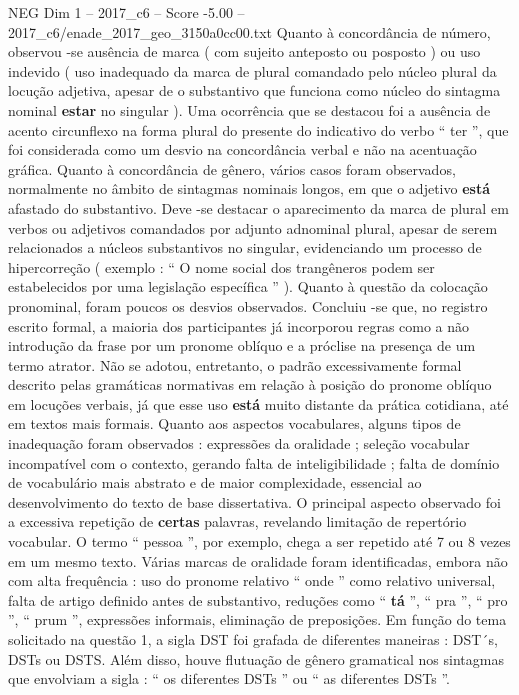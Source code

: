\begin{textsample}{NEG Dim 1 – 2017\_c6 – Score -5.00 – 2017\_c6/enade\_2017\_geo\_3150a0cc00.txt}
Quanto à concordância de número, observou -se ausência de marca ( com sujeito anteposto ou posposto ) ou uso indevido ( uso inadequado da marca de plural comandado pelo núcleo plural da locução adjetiva, apesar de o substantivo que funciona como núcleo do sintagma nominal \textbf{estar} no singular ).
Uma ocorrência que se destacou foi a ausência de acento circunflexo na forma plural do presente do indicativo do verbo “ ter ”, que foi considerada como um desvio na concordância verbal e não na acentuação gráfica.
Quanto à concordância de gênero, vários casos foram observados, normalmente no âmbito de sintagmas nominais longos, em que o adjetivo \textbf{está} afastado do substantivo.
Deve -se destacar o aparecimento da marca de plural em verbos ou adjetivos comandados por adjunto adnominal plural, apesar de serem relacionados a núcleos substantivos no singular, evidenciando um processo de hipercorreção ( exemplo : “ O nome social dos trangêneros podem ser estabelecidos por uma legislação específica ” ).
Quanto à questão da colocação pronominal, foram poucos os desvios observados.
Concluiu -se que, no registro escrito formal, a maioria dos participantes já incorporou regras como a não introdução da frase por um pronome oblíquo e a próclise na presença de um termo atrator.
Não se adotou, entretanto, o padrão excessivamente formal descrito pelas gramáticas normativas em relação à posição do pronome oblíquo em locuções verbais, já que esse uso \textbf{está} muito distante da prática cotidiana, até em textos mais formais.
Quanto aos aspectos vocabulares, alguns tipos de inadequação foram observados : expressões da oralidade ; seleção vocabular incompatível com o contexto, gerando falta de inteligibilidade ; falta de domínio de vocabulário mais abstrato e de maior complexidade, essencial ao desenvolvimento do texto de base dissertativa.
O principal aspecto observado foi a excessiva repetição de \textbf{certas} palavras, revelando limitação de repertório vocabular.
O termo “ pessoa ”, por exemplo, chega a ser repetido até 7 ou 8 vezes em um mesmo texto.
Várias marcas de oralidade foram identificadas, embora não com alta frequência : uso do pronome relativo “ onde ” como relativo universal, falta de artigo definido antes de substantivo, reduções como “ \textbf{tá} ”, “ pra ”, “ pro ”, “ prum ”, expressões informais, eliminação de preposições.
Em função do tema solicitado na questão 1, a sigla DST foi grafada de diferentes maneiras : DST´s, DSTs ou DSTS.
Além disso, houve flutuação de gênero gramatical nos sintagmas que envolviam a sigla : “ os diferentes DSTs ” ou “ as diferentes DSTs ”.

\end{textsample}
